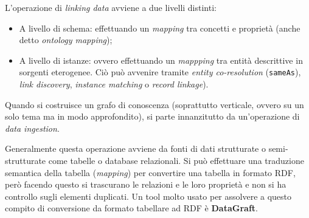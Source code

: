 \documentclass[11pt]{article}
\begin{document}
L'operazione di \textit{linking data} avviene a due livelli distinti:
\begin{itemize}
\item A livello di schema: effettuando un \textit{mapping} tra concetti e proprietà (anche detto \textit{ontology mapping}); \item A livello di istanze: ovvero effettuando un \textit{mappping} tra entità descrittive in sorgenti eterogenee. Ciò può avvenire tramite \textit{entity co-resolution} (\verb|sameAs|), \textit{link discovery}, \textit{instance matching} o \textit{record linkage}).
\end{itemize}
Quando si costruisce un grafo di conoscenza (soprattutto verticale, ovvero su un solo tema ma in modo approfondito), si parte innanzitutto da un'operazione di \textit{data ingestion}. 

Generalmente questa operazione avviene da fonti di dati strutturate o semi-strutturate come tabelle o database relazionali.
Si può effettuare una traduzione semantica della tabella (\textit{mapping}) per convertire una tabella in formato RDF, però facendo questo si trascurano le relazioni e le loro proprietà e non si ha controllo sugli elementi duplicati. Un tool molto usato per assolvere a questo compito di conversione da formato tabellare ad RDF è \textbf{DataGraft}.
\end{document}
